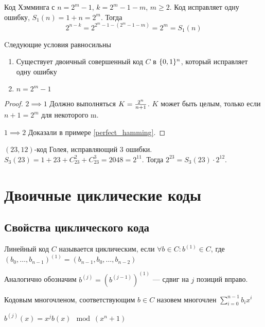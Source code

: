 \begin{example}
\label{perfect_hamming}
Код Хэмминга с $n = 2^m - 1$, $k = 2^m - 1 - m$, $m \ge 2$. Код исправляет одну ошибку,
$S_1(n) = 1 + n = 2^m$. Тогда
$$2^{n-k} = 2^{2^m - 1 - (2^m - 1 - m)} = 2^m = S_1(n)$$
\end{example}

\begin{theorem}
Cледующие условия равносильны
\begin{enumerate} 
\item Существует двоичный совершенный код $C$ в $\{0,1\}^{n}$, который исправляет
одну ошибку
\item $n = 2^m - 1$ 
\end{enumerate}
\end{theorem}

\begin{proof}
$2 \implies 1$ 
Должно выполняться $K = {2^n \over n+1}$. $K$ может быть целым, только если 
$n+1 = 2^m$ для некоторого m.

$1 \implies 2$ Доказали в примере \ref{perfect_hamming}.
\end{proof}

\begin{example}
$(23,12)$-код Голея, исправляющий $3$ ошибки. $S_3(23) = 1 + 23 + C_{23}^2 + C_{23}^3 
= 2048 = 2^{11}$. Тогда $2^{23} = S_3(23) \cdot 2^{12}$.
\end{example}

\section{Двоичные циклические коды}
\subsection{Свойства циклического кода}
\begin{definition}
Линейный код $C$ называется циклическим, если $\forall b \in C \colon b^{(1)} \in C$,
где $(b_0, \ldots, b_{n-1})^{(1)} = (b_{n-1}, b_0, \ldots, b_{n-2})$

Аналогично обозначим $b^{(j)} = (b^{(j-1)})^{(1)}$ --- сдвиг на $j$ позиций вправо.
\end{definition}

\begin{definition}
Кодовым многочленом, соответствующим $b \in C$ назовем многочлен
$\sum\limits_{i=0}^{n-1} b_i x^i$
\end{definition}

\begin{theorem}
\label{mod_representation}
$b^{(j)}(x) = x^{j} b(x) \mod (x^n + 1)$
\end{theorem}

